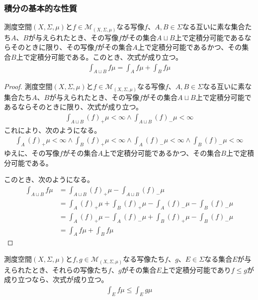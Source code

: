 \documentclass[dvipdfmx]{jsarticle}
\begin{document}
\subsubsection{積分の基本的な性質}%
\begin{thm}\label{4.6.1.16}
測度空間$(X,\varSigma,\mu)$と$f \in \mathcal{M}_{(X,\varSigma,\mu)}$なる写像$f$、$A,B \in \varSigma$なる互いに素な集合たち$A$、$B$が与えられたとき、その写像$f$がその集合$A \sqcup B$上で定積分可能であるならそのときに限り、その写像$f$がその集合$A$上で定積分可能であるかつ、その集合$B$上で定積分可能である。このとき、次式が成り立つ。
\begin{align*}
\int_{A \sqcup B} {f\mu} = \int_{A} {f\mu} + \int_{B} {f\mu}
\end{align*}
\end{thm}
\begin{proof}
測度空間$(X,\varSigma,\mu)$と$f \in \mathcal{M}_{(X,\varSigma,\mu)}$なる写像$f$、$A,B \in \varSigma$なる互いに素な集合たち$A$、$B$が与えられたとき、その写像$f$がその集合$A \sqcup B$上で定積分可能であるならそのときに限り、次式が成り立つ。
\begin{align*}
\int_{A \sqcup B} {(f)_{+}\mu} < \infty \land \int_{A \sqcup B} {(f)_{-}\mu} < \infty
\end{align*}
これにより、次のようになる。
\begin{align*}
\int_{A} {(f)_{+}\mu} < \infty \land \int_{B} {(f)_{+}\mu} < \infty \land \int_{A} {(f)_{-}\mu} < \infty \land \int_{B} {(f)_{-}\mu} < \infty
\end{align*}
ゆえに、その写像$f$がその集合$A$上で定積分可能であるかつ、その集合$B$上で定積分可能である。\par
このとき、次のようになる。
\begin{align*}
\int_{A \sqcup B} {f\mu} &= \int_{A \sqcup B} {(f)_{+}\mu} - \int_{A \sqcup B} {(f)_{-}\mu}\\
&= \int_{A} {(f)_{+}\mu} + \int_{B} {(f)_{+}\mu} - \int_{A} {(f)_{-}\mu} - \int_{B} {(f)_{-}\mu}\\
&= \int_{A} {(f)_{+}\mu} - \int_{A} {(f)_{-}\mu} + \int_{B} {(f)_{+}\mu} - \int_{B} {(f)_{-}\mu}\\
&= \int_{A} {f\mu} + \int_{B} {f\mu}
\end{align*}
\end{proof}
\begin{thm}\label{4.6.1.17}
測度空間$(X,\varSigma,\mu)$と$f,g \in \mathcal{M}_{(X,\varSigma,\mu)}$なる写像たち$f$、$g$、$E \in \varSigma$なる集合$E$が与えられたとき、それらの写像たち$f$、$g$がその集合$E$上で定積分可能であり$f \leq g$が成り立つなら、次式が成り立つ。
\begin{align*}
\int_{E} {f\mu} \leq \int_{E} {g\mu}
\end{align*}
\end{thm}
\end{document}
